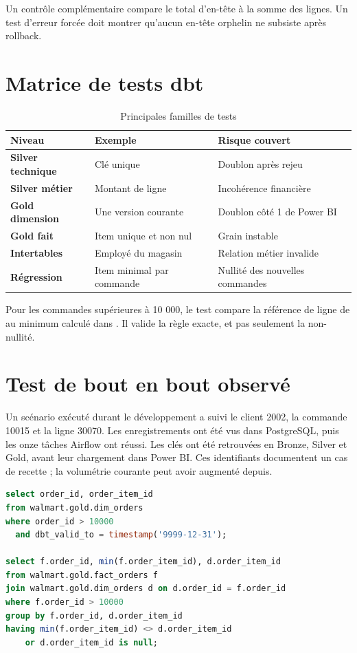 Un contrôle complémentaire compare le total d'en-tête à la somme des lignes. Un test d'erreur forcée doit montrer qu'aucun en-tête orphelin ne subsiste après rollback.

\section{Matrice de tests dbt}
\begin{table}[htbp]
\centering
\caption{Principales familles de tests}
\label{tab:test-matrix}
\begin{tabularx}{\textwidth}{>{\bfseries}p{3.4cm}p{4cm}X}
\toprule
Niveau & Exemple & Risque couvert \\
\midrule
Silver technique & Clé unique & Doublon après rejeu \\
Silver métier & Montant de ligne & Incohérence financière \\
Gold dimension & Une version courante & Doublon côté 1 de Power BI \\
Gold fait & Item unique et non nul & Grain instable \\
Intertables & Employé du magasin & Relation métier invalide \\
Régression & Item minimal par commande & Nullité des nouvelles commandes \\
\bottomrule
\end{tabularx}
\end{table}

Pour les commandes supérieures à 10 000, le test compare la référence de ligne de  au minimum calculé dans . Il valide la règle exacte, et pas seulement la non-nullité.

\section{Test de bout en bout observé}
Un scénario exécuté durant le développement a suivi le client 2002, la commande 10015 et la ligne 30070. Les enregistrements ont été vus dans PostgreSQL, puis les onze tâches Airflow ont réussi. Les clés ont été retrouvées en Bronze, Silver et Gold, avant leur chargement dans Power BI. Ces identifiants documentent un cas de recette ; la volumétrie courante peut avoir augmenté depuis.

\begin{lstlisting}[language=SQL,caption={Recette Gold des nouvelles commandes}]
select order_id, order_item_id
from walmart.gold.dim_orders
where order_id > 10000
  and dbt_valid_to = timestamp('9999-12-31');

select f.order_id, min(f.order_item_id), d.order_item_id
from walmart.gold.fact_orders f
join walmart.gold.dim_orders d on d.order_id = f.order_id
where f.order_id > 10000
group by f.order_id, d.order_item_id
having min(f.order_item_id) <> d.order_item_id
    or d.order_item_id is null;
\end{lstlisting}

